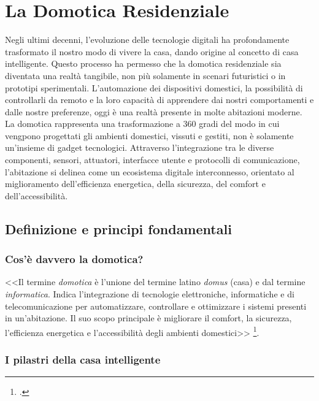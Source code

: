
\chapter{La Domotica Residenziale}

Negli ultimi decenni, l’evoluzione delle tecnologie digitali ha profondamente trasformato il nostro modo di vivere la casa, dando origine al concetto di casa intelligente. Questo processo ha permesso che la domotica residenziale sia diventata una realtà tangibile, non più solamente in scenari futuristici o in prototipi sperimentali. L'automazione dei dispositivi domestici, la possibilità di controllarli da remoto e la loro capacità di apprendere dai nostri comportamenti e dalle nostre preferenze, oggi è una realtà presente in molte abitazioni moderne.\\

La domotica rappresenta una trasformazione a 360 gradi del modo in cui vengpono progettati gli ambienti domestici, vissuti e gestiti, non è solamente un'insieme di gadget tecnologici. Attraverso l’integrazione tra le diverse componenti, sensori, attuatori, interfacce utente e protocolli di comunicazione, l’abitazione si delinea come un ecosistema digitale interconnesso, orientato al miglioramento dell’efficienza energetica, della sicurezza, del comfort e dell’accessibilità.\\

\section{Definizione e principi fondamentali}

\subsection{Cos'è davvero la domotica?}

<<Il termine \textit{domotica} è l'unione del termine latino \textit{domus} (casa) e dal termine \textit{informatica}. Indica l'integrazione di tecnologie elettroniche, informatiche e di telecomunicazione per automatizzare, controllare e ottimizzare i sistemi presenti in un'abitazione. Il suo scopo principale è migliorare il comfort, la sicurezza, l'efficienza energetica e l'accessibilità degli ambienti domestici>> \footcite{domoticaWiki}.

\subsection{I pilastri della casa intelligente}

